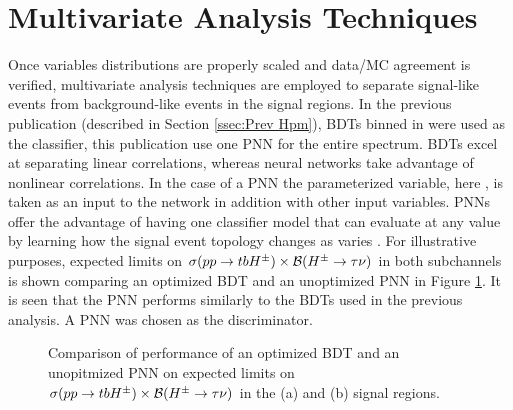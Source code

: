 	\section{Multivariate Analysis Techniques}\label{sec:mva}
		Once variables distributions are properly scaled and data/\gls{MC} agreement is verified, multivariate analysis techniques are employed to separate signal-like events from background-like events in the signal regions. In the previous publication (described in Section \ref{ssec:Prev Hpm}), \glspl{BDT} binned in \mHpm were used as the classifier, this publication use one \gls{PNN} for the entire \mHpm spectrum. \glspl{BDT} excel at separating linear correlations, whereas neural networks take advantage of nonlinear correlations. In the case of a \gls{PNN} the parameterized variable, here \mHpm, is taken as an input to the network in addition with other input variables. \gls{PNN}s offer the advantage of having one classifier model that can evaluate at any \mHpm value by learning how the signal event topology changes as \mHpm varies \cite{PNN}. For illustrative purposes, expected limits on $\sigma(pp\to tbH^{\pm})\times \mathrm{\cal{B}}(H^{\pm} \to \tau \nu)$ in both subchannels is shown comparing an optimized \gls{BDT} and an unoptimized \gls{PNN} in Figure \ref{fig:bdt-vs-pnn-expected-limits}. It is seen that the \gls{PNN} performs similarly to the \glspl{BDT} used in the previous analysis. A \gls{PNN} was chosen as the discriminator. 

		\begin{figure}
		\caption{Comparison of performance of an optimized \gls{BDT} and an unopitmized \gls{PNN} on expected limits on $\sigma(pp\to tbH^{\pm})\times \mathrm{\cal{B}}(H^{\pm} \to \tau \nu)$ in the \taujets (a) and \taulep (b) signal regions. }
		\label{fig:bdt-vs-pnn-expected-limits}
		\end{figure}

